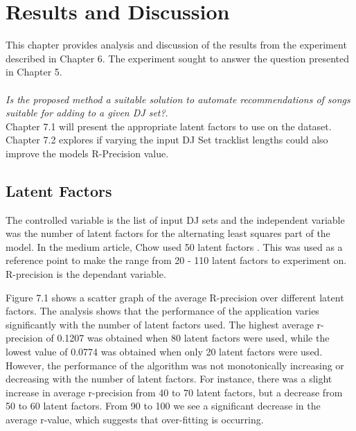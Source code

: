 
\graphicspath{{Chapter6/}}

\chapter{Results and Discussion}

This chapter provides analysis and discussion of the results from the experiment described
in Chapter 6. The experiment sought to answer the question presented in Chapter 5.
\\
\\
\textit{Is the proposed method a suitable solution to automate recommendations of songs suitable for adding to a given DJ set?}.
\\

Chapter 7.1 will present the appropriate latent factors to use on the dataset. Chapter 7.2 explores if varying the input DJ Set tracklist lengths could also improve the models R-Precision value.

\section{Latent Factors}
The controlled variable is the list of input DJ sets and the independent variable was the number of latent factors for the alternating least squares part of the model. In the medium article, Chow used 50 latent factors \citep{chow_music_2020}. This was used as a reference point to make the range from 20 - 110 latent factors to experiment on. R-precision is the dependant variable.

Figure 7.1 shows a scatter graph of the average R-precision over different latent factors. The analysis shows that the performance of the application varies significantly with the number of latent factors used. The highest average r-precision of 0.1207 was obtained when 80 latent factors were used, while the lowest value of 0.0774 was obtained when only 20 latent factors were used. However, the performance of the algorithm was not monotonically increasing or decreasing with the number of latent factors. For instance, there was a slight increase in average r-precision from 40 to 70 latent factors, but a decrease from 50 to 60 latent factors. From 90 to 100 we see a significant decrease in the average r-value, which suggests that over-fitting is occurring.

